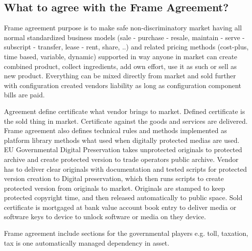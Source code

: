 \subsection{What to agree with the Frame Agreement?}
\label{frame_agreement_what}
Frame agreement purpose is to make safe non-discriminatory market having all normal standardized business models (sale - purchase - resale, maintain - serve - subscript - transfer, lease - rent, share, ..) and related pricing methods (cost-plus, time based, variable, dynamic) supported in way anyone in market can create combined product, collect ingredients, add own effort, use it as such or sell as new product. Everything can be mixed directly from market and sold further with configuration created vendors liability as long as configuration component bills are paid.

Agreement define certificate what vendor brings to market. Defined certificate is the sold thing in market. Certificate against the goods and services are delivered. Frame agreement also defines technical rules and methods implemented as platform library methods what used when digitally protected medias are used. EU Governmental Digital Preservation takes unprotected originals to protected archive and create protected version to trade operators public archive. Vendor has to deliver clear originals with documentation and tested scripts for protected version creation to Digital preservation\cite{EULegalDepositScheme}, which then runs scripts to create protected version from originals to market. Originals are stamped to keep protected copyright time, and then released automatically to public space. Sold certificate is mortgaged at bank value account book entry\cite{BookEntry}\cite{LEX_2017/384}\cite{EU_Settlement} to deliver media or software keys to device to unlock software or media on they device.

Frame agreement include sections for the governmental players e.g. toll, taxation, tax is one automatically managed dependency in asset.


